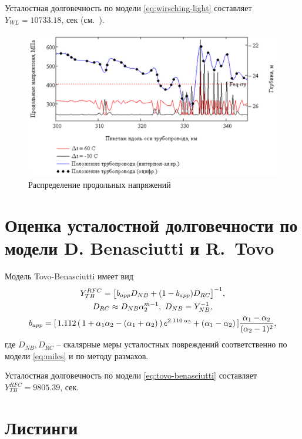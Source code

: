 \documentclass[
    11pt,
    a4paper,
    utf8,
]{article}
\begin{document}
Усталостная долговечность по модели \eqref{eq:wirsching-light} составляет $ Y_{WL} = 10733.18 $, сек (см.~).
\begin{figure}[h!]
	\centering
	\includegraphics[scale=0.65]{figures/figure.png}
	\caption{ Распределение продольных напряжений }\label{fig:graph}
\end{figure}

\section{Оценка усталостной долговечности по модели D. Benasciutti и R.~Tovo}

Модель Tovo-Benasciutti имеет вид \cite{tovo-benasciutti-2006}
\begin{gather}\label{eq:tovo-benasciutti}
	Y_{TB}^{RFC} = \big[ b_{app} D_{NB} + (1 - b_{app}) D_{RC} \big]^{-1}, \\
	D_{RC} \approx D_{NB} \alpha_2^{m-1}, \ D_{NB} = Y_{NB}^{-1}, \notag \\
	b_{app} = [\, 1.112 \,(\, 1 + \alpha_1 \alpha_2 - (\alpha_1 + \alpha_2) \,) \, e^{2.110 \, \alpha_2} + (\alpha_1 - \alpha_2)\,] \dfrac{ \alpha_1 - \alpha_2 }{ (\alpha_2 - 1)^2}, \notag
\end{gather}
где $ D_{NB}, D_{RC} $ -- скалярные меры усталостных повреждений соответственно по модели \eqref{eq:miles} и по методу размахов.

Усталостная долговечность по модели \eqref{eq:tovo-benasciutti} составляет $ Y_{TB}^{RFC} = 9805.39 $, сек.

\appendix

\section{Листинги}
\end{document}
